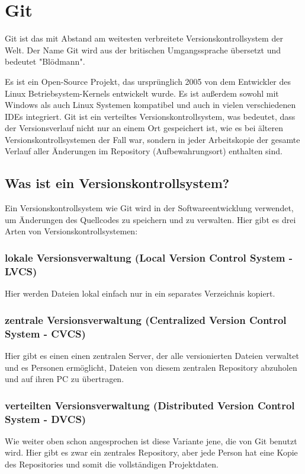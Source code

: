 \section{Git}

Git ist das mit Abstand am weitesten verbreitete Versionskontrollsystem der Welt. Der Name Git wird aus der britischen 
Umgangssprache übersetzt und bedeutet "Blödmann".
\cite{sysarch-git-1}

Es ist ein Open-Source Projekt, 
das ursprünglich 2005 von dem Entwickler des Linux Betriebsystem-Kernels entwickelt wurde. Es ist außerdem sowohl mit 
Windows als auch Linux Systemen kompatibel und auch in vielen verschiedenen IDEs integriert. Git ist ein verteiltes Versionskontrollsystem, 
was bedeutet, dass der Versionsverlauf nicht nur an einem Ort gespeichert ist, wie es bei älteren Versionskontrollsystemen der Fall war, 
sondern in jeder Arbeitskopie der gesamte Verlauf aller Änderungen im Repository (Aufbewahrungsort) enthalten sind. 
\cite{sysarch-git-2}

\subsection{Was ist ein Versionskontrollsystem?}

Ein Versionskontrollsystem wie Git wird in der Softwareentwicklung verwendet, 
um Änderungen des Quellcodes zu speichern und zu verwalten. 
Hier gibt es drei Arten von Versionskontrollsystemen:
\cite{sysarch-git-2}

\subsubsection{lokale Versionsverwaltung (Local Version Control System - LVCS)}
Hier werden Dateien lokal einfach nur in ein separates Verzeichnis kopiert.
\cite{sysarch-git-2}

\subsubsection{zentrale Versionsverwaltung (Centralized Version Control System - CVCS)}
Hier gibt es einen einen zentralen Server, der alle versionierten Dateien verwaltet und es Personen ermöglicht, 
Dateien von diesem zentralen Repository abzuholen und auf ihren PC zu übertragen.
\cite{sysarch-git-2}

\subsubsection{verteilten Versionsverwaltung (Distributed Version Control System - DVCS)}
Wie weiter oben schon angesprochen ist diese Variante jene, die von Git benutzt wird. Hier gibt es zwar ein zentrales Repository, 
aber jede Person  hat eine Kopie des Repositories und somit die vollständigen Projektdaten.
\cite{sysarch-git-2}

